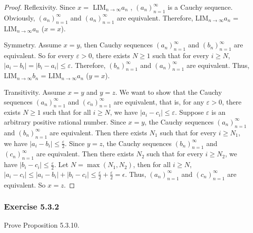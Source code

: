\documentclass[12pt, letter]{article}
\newcommand{\ssc}{\subsubsection* }
\newcommand{\an}{$(a_n)_{n=1}^\infty$ }
\newcommand{\bn}{$(b_n)_{n=1}^\infty$ }
\newcommand{\cn}{$(c_n)_{n=1}^\infty$ }
\newcommand{\la}{LIM$_{n\to\infty}a_n$ }
\newcommand{\lb}{LIM$_{n\to\infty}b_n$ }
\newcommand{\E}{Exercise }
\begin{document}
\begin{proof}
    Reflexivity. Since $x=$ \la, \an is a Cauchy sequence. Obviously, \an and \an are equivalent. Therefore, \la = \la ($x=x$).

    Symmetry. Assume $x=y$, then Cauchy sequences \an and \bn are equivalent. So for every $\varepsilon>0$, there exists $N\geq 1$ such that for every $i\geq N$, 
    $|a_i-b_i|=|b_i-a_i|\leq\varepsilon$. Therefore, \bn and \an are equivalent. Thus, \lb = \la ($y=x$).

    Transitivity. Assume $x=y$ and $y=z$. We want to show that the Cauchy sequences \an and \cn are equivalent, that is, 
    for any $\varepsilon>0$, there exists $N\geq 1$ such that for all $i\geq N$, we have $|a_i-c_i|\leq \varepsilon$. Suppose $\varepsilon$ is an arbitrary positive rational number.
     Since $x=y$, the Cauchy sequences \an and \bn are equivalent. Then there exists $N_1$ such that for every $i\geq N_1$, we have $|a_i-b_i|\leq \frac{\varepsilon}{2}$.
     Since $y=z$, the Cauchy sequences \bn and \cn are equivalent. Then there exists $N_2$ such that for every $i\geq N_2$, we have $|b_i-c_i|\leq \frac{\varepsilon}{2}$.
     Let $N=\max(N_1,N_2)$, then for all $i\geq N$, $|a_i-c_i|\leq |a_i-b_i|+|b_i-c_i|\leq \frac{\varepsilon}{2}+\frac{\varepsilon}{2}=\epsilon$. Thus, \an and \cn are equivalent. 
     So $x=z$.
\end{proof} 
\ssc{\E 5.3.2}
Prove Proposition 5.3.10.
\end{document}
